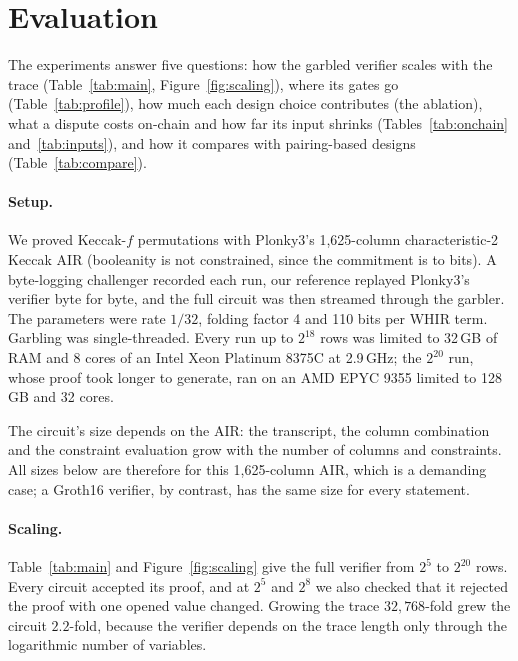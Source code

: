 \documentclass[11pt]{article}
\begin{document}
\section{Evaluation}\label{sec:eval}

The experiments answer five questions: how the garbled verifier scales with the
trace (Table~\ref{tab:main}, Figure~\ref{fig:scaling}), where its gates go
(Table~\ref{tab:profile}), how much each design choice contributes (the
ablation), what a dispute costs on-chain and how far its input shrinks
(Tables~\ref{tab:onchain} and~\ref{tab:inputs}), and how it compares with
pairing-based designs (Table~\ref{tab:compare}).

\paragraph{Setup.} We proved Keccak-$f$ permutations with Plonky3's
1{,}625-column characteristic-2 Keccak AIR (booleanity is not constrained,
since the commitment is to bits). A byte-logging challenger recorded each run,
our reference replayed Plonky3's verifier byte for byte, and the full circuit was
then streamed through the garbler. The parameters were rate $1/32$, folding
factor 4 and 110 bits per WHIR term. Garbling was single-threaded. Every run up to
$2^{18}$ rows was limited to 32\,GB of RAM and 8 cores of an Intel Xeon Platinum
8375C at 2.9\,GHz; the $2^{20}$ run, whose proof took longer to generate, ran on
an AMD EPYC 9355 limited to 128\,GB and 32 cores.

The circuit's size depends on the AIR: the transcript, the column combination
and the constraint evaluation grow with the number of columns and constraints.
All sizes below are therefore for this 1{,}625-column AIR, which is a demanding
case; a Groth16 verifier, by contrast, has the same size for every statement.

\paragraph{Scaling.} Table~\ref{tab:main} and Figure~\ref{fig:scaling} give the
full verifier from $2^5$ to $2^{20}$ rows. Every circuit accepted its proof, and
at $2^5$ and $2^8$ we also checked that it rejected the proof with one opened
value changed. Growing the trace $32{,}768$-fold grew the circuit $2.2$-fold,
because the verifier depends on the trace length only through the logarithmic
number of variables.
\end{document}
